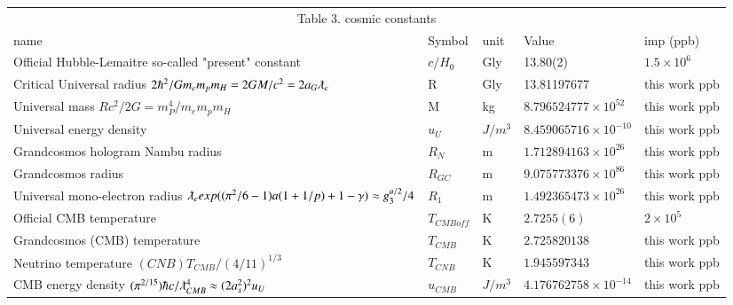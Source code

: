 \documentclass[a4paper,9pt]{article}
\begin{document}
\begin{table}
\label{tab:3:table3}
  \hskip-2.0cm\begin{tabular}{lllll}
    \toprule
    \multicolumn{5}{c}{Table 3. cosmic constants}                   \\ 
      \cmidrule(r){1-5}
     name & Symbol   & unit   & Value & imp (ppb) \\
 \midrule
   
    
    Official Hubble-Lemaitre so-called "present" constant & $c/H_0$ & Gly & 13.80(2)    & $1.5 \times 10^6$ \\
  
    Critical Universal radius $2\hbar^2/Gm_em_pm_H=2GM/c^2=2a_G\lambdabar_{e}$ & R &  Gly & 13.81197677  & this work ppb\\
   
   Universal mass $Rc^2/2G = m_P^4/m_em_pm_H$ & M & kg & $8.796524777 \times 10^{52}$ & this work ppb \\ 
   
   Universal energy density & $u_U$ & $J/m^3$ & $8.459065716 \times 10^{-10}$ & this work ppb \\
   
   Grandcosmos hologram Nambu radius & $R_N$ &  m & $1.712894163 \times 10^{26}$ & this work ppb\\
   
   Grandcosmos radius & $R_{GC}$ &  m & $9.075773376 \times 10^{86}$ & this work ppb \\
   
   Universal mono-electron radius $\lambdabar_e exp((\pi^2/6-1)a(1+1/p)+1-\gamma)\approx g_3^{a/2}/4$ & $R_1$ &  m & $1.492365473 \times 10^{26}$ & this work ppb \\
    
     Official CMB temperature & $T_{CMBoff}$ & K & $2.7255(6)$ & $2 \times 10^5$ \\
    
   Grandcosmos (CMB) temperature & $T_{CMB}$ & K & $2.725820138$ & this work ppb \\
   
 Neutrino temperature  $(CNB)T_{CMB}/ (4/11)^{1/3}$ & $T_{CNB}$ & K & $1.945597343$ & this work ppb \\
 
 CMB energy density $(\pi^{2/15})\hbar c/ \lambdabar_{CMB}^4 \approx (2a_s^2)^2 u_U$ & $u_{CMB}$ & $J/m^3$ & $4.176762758 \times 10^{-14}$ & this work ppb\\
 

\end{tabular}
\end{table}
\end{document}
